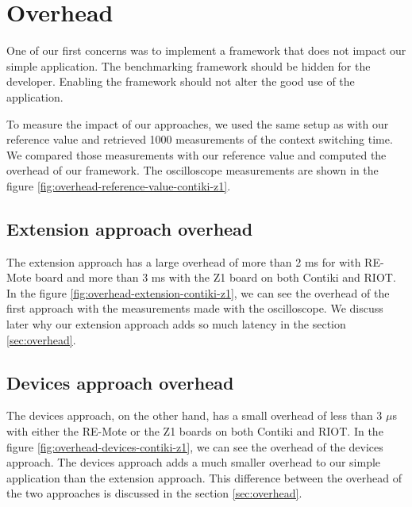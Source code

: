 \section{Overhead}

One of our first concerns was to implement a framework that does not impact our simple application.
The benchmarking framework should be hidden for the developer.
Enabling the framework should not alter the good use of the application.

To measure the impact of our approaches, we used the same setup as with our reference value and retrieved 1000 measurements of the context switching time.
We compared those measurements with our reference value and computed the overhead of our framework.
The oscilloscope measurements are shown in the figure \ref{fig:overhead-reference-value-contiki-z1}.

\subsection{Extension approach overhead}

The extension approach has a large overhead of more than 2 ms for with RE-Mote board and more than 3 ms with the Z1 board on both Contiki and RIOT.
In the figure \ref{fig:overhead-extension-contiki-z1}, we can see the overhead of the first approach with the measurements made with the oscilloscope.
We discuss later why our extension approach adds so much latency in the section \ref{sec:overhead}.

\subsection{Devices approach overhead}

The devices approach, on the other hand, has a small overhead of less than 3 $\mu$s with either the RE-Mote or the Z1 boards on both Contiki and RIOT.
In the figure \ref{fig:overhead-devices-contiki-z1}, we can see the overhead of the devices approach.
The devices approach adds a much smaller overhead to our simple application than the extension approach.
This difference between the overhead of the two approaches is discussed in the section \ref{sec:overhead}.

